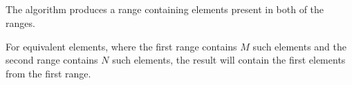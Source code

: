 \subsection{\texorpdfstring{}{\texttt{std::set\_intersection}}}

The  algorithm produces a range containing elements present in both of the ranges.


For equivalent elements, where the first range contains $M$ such elements and the second range contains $N$ such elements, the result will contain the first  elements from the first range.
